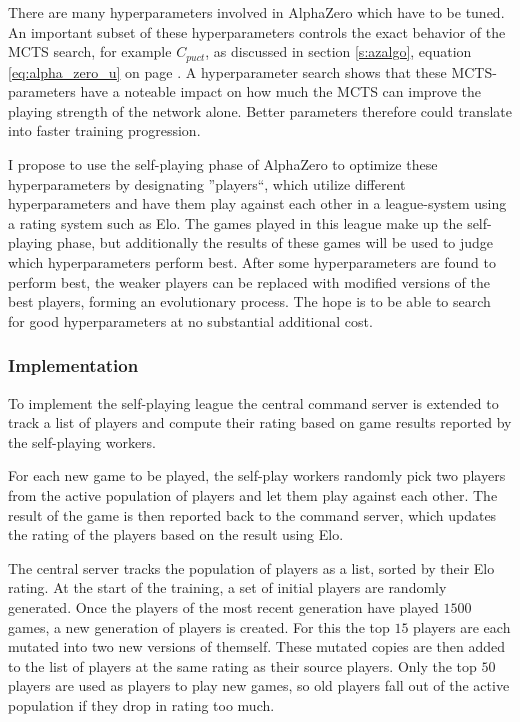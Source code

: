 \documentclass[12pt,onecolumn,oneside,titlepage]{article}
\begin{document}
There are many hyperparameters involved in AlphaZero which have to be tuned. An important subset of these hyperparameters controls the exact behavior of the MCTS search, for example $C_{puct}$, as discussed in section \ref{s:azalgo}, equation \ref{eq:alpha_zero_u} on page \pageref{eq:alpha_zero_u}.
A hyperparameter search shows that these MCTS-parameters have a noteable impact on how much the MCTS can improve the playing strength of the network alone. Better parameters therefore could translate into faster training progression.

I propose to use the self-playing phase of AlphaZero to optimize these hyperparameters by designating ''players``, which utilize different hyperparameters and have them play against each other in a league-system using a rating system such as Elo. The games played 
in this league make up the self-playing phase, but additionally the results of these games will be used to judge which hyperparameters perform best. After some hyperparameters are found to perform best, the weaker players can be replaced with modified versions 
of the best players, forming an evolutionary process. The hope is to be able to search for good hyperparameters at no substantial additional cost.

\subsubsection{Implementation}

To implement the self-playing league the central command server is extended to track a list of players and compute their rating based on game results reported by the self-playing workers.

For each new game to be played, the self-play workers randomly pick two players from the active population of players and let them play against each other. The result of the game is then reported back to the command server, which updates the rating of the players based on the result using Elo.

The central server tracks the population of players as a list, sorted by their Elo rating. 
At the start of the training, a set of initial players are randomly generated.
Once the players of the most recent generation have played $1500$ games, a new generation of players is created. For this the top $15$ players are each mutated into two new versions of themself. These mutated copies are then added to the list of players at the same rating as their source players.
Only the top $50$ players are used as players to play new games, so old players fall out of the active population if they drop in rating too much.
\end{document}
